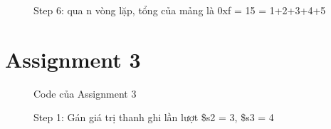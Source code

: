 \documentclass[a4paper,12pt]{article}
\begin{document}
\begin{figure}[!h]
	\centerline{}
	\caption*{Step 6: qua n vòng lặp, tổng của mảng là 0xf = 15 = 1+2+3+4+5}
	\label{fig:2s6}
\end{figure}
\clearpage
\newpage
\section{Assignment 3}
\begin{figure}[!h]
	\centerline{}
	\caption{Code của Assignment 3}
	\label{fig:ass3}
\end{figure}
\begin{figure}[!h]
	\centerline{}
	\caption*{Step 1: Gán giá trị thanh ghi lần lượt \$s2 = 3, \$s3 = 4}
	\label{fig:3s1}
\end{figure}
\end{document}
